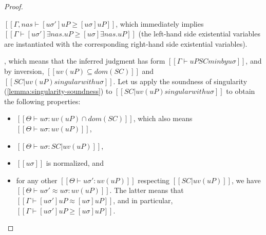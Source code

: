 \begin{proof}
\begin{caseof}
\begin{itemize}
                    $[[Γ, nas ⊢ [uσ']uP ≥ [uσ]uP ]]$, which immediately implies 
                    $[[Γ ⊢ [uσ']∃nas.uP ≥ [uσ]∃nas.uP ]]$ (the left-hand side
                    existential variables are instantiated with the corresponding 
                    right-hand side existential variables).
            \end{itemize}
        \item {}, which means that
            the inferred judgment has form $[[Γ ⊢ uP SC minby uσ]]$,
            and by inversion, $[[uv(uP) ⊆ dom(SC)]]$ and
            $[[SC|uv(uP) singular with uσ]]$. Let us apply the soundness of singularity
            (\cref{lemma:singularity-soundness}) to $[[SC|uv(uP) singular with uσ]]$ to
            obtain the following properties:
            \begin{itemize}
                \item $[[ Θ ⊢ uσ : uv(uP) ∩ dom(SC) ]]$, which also means 
                    $[[Θ ⊢ uσ : uv(uP)]]$,
                \item $[[Θ ⊢ uσ : SC|uv(uP)]]$,
                \item $[[uσ]]$ is normalized, and
                \item for any other $[[Θ ⊢ uσ' : uv(uP) ]]$
                    respecting $[[SC|uv(uP)]]$, we have
                    $[[Θ ⊢ uσ' ≈ uσ : uv(uP)]]$. The latter means that
                    $[[Γ ⊢ [uσ']uP ≈ [uσ]uP]]$, and in particular, 
                    $[[Γ ⊢ [uσ']uP ≥ [uσ]uP]]$.
            \end{itemize}
    \end{caseof}

\end{proof}

